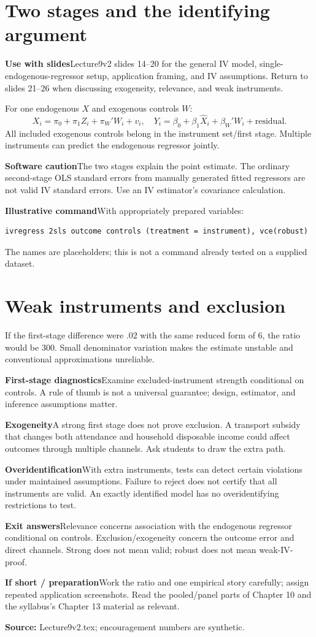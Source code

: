 \documentclass[11pt,a4paper]{article}
\newcommand{\heading}[1]{\section*{\color{accent}#1}}
\newcommand{\cue}[2]{\par\noindent\textbf{#1}\quad #2\par}
\begin{document}
\newpage
\heading{Two stages and the identifying argument}
\cue{Use with slides}{Lecture9v2 slides 14--20 for the general IV model, single-endogenous-regressor setup, application framing, and IV assumptions. Return to slides 21--26 when discussing exogeneity, relevance, and weak instruments.}
For one endogenous $X$ and exogenous controls $W$:
\[
X_i=\pi_0+\pi_1 Z_i+\pi_W'W_i+v_i,
\quad
Y_i=\beta_0+\beta_1\hat X_i+\beta_W'W_i+\text{residual}.
\]
All included exogenous controls belong in the instrument set/first stage. Multiple instruments can predict the endogenous regressor jointly.
\cue{Software caution}{The two stages explain the point estimate. The ordinary second-stage OLS standard errors from manually generated fitted regressors are not valid IV standard errors. Use an IV estimator's covariance calculation.}
\cue{Illustrative command}{With appropriately prepared variables:}
\begin{verbatim}
ivregress 2sls outcome controls (treatment = instrument), vce(robust)
\end{verbatim}
The names are placeholders; this is not a command already tested on a supplied dataset.
\heading{Weak instruments and exclusion}
If the first-stage difference were $.02$ with the same reduced form of 6, the ratio would be 300. Small denominator variation makes the estimate unstable and conventional approximations unreliable.
\cue{First-stage diagnostics}{Examine excluded-instrument strength conditional on controls. A rule of thumb is not a universal guarantee; design, estimator, and inference assumptions matter.}
\cue{Exogeneity}{A strong first stage does not prove exclusion. A transport subsidy that changes both attendance and household disposable income could affect outcomes through multiple channels. Ask students to draw the extra path.}
\cue{Overidentification}{With extra instruments, tests can detect certain violations under maintained assumptions. Failure to reject does not certify that all instruments are valid. An exactly identified model has no overidentifying restrictions to test.}
\cue{Exit answers}{Relevance concerns association with the endogenous regressor conditional on controls. Exclusion/exogeneity concern the outcome error and direct channels. Strong does not mean valid; robust does not mean weak-IV-proof.}
\cue{If short / preparation}{Work the ratio and one empirical story carefully; assign repeated application screenshots. Read the pooled/panel parts of Chapter 10 and the syllabus's Chapter 13 material as relevant.}
\textbf{Source:} Lecture9v2.tex; encouragement numbers are synthetic.
\end{document}
